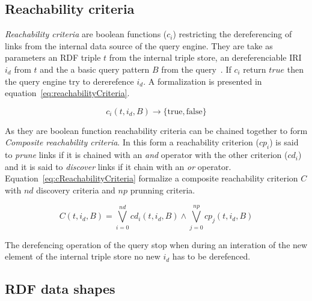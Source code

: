 \subsection{Reachability criteria}

\emph{Reachability criteria} are boolean functions ($c_i$) restricting the dereferencing of links from the internal data source of the query engine.
They are take as parameters an RDF triple $t$ from the internal triple store, an dereferenciable IRI $i_d$ from $t$ and the a basic query pattern $B$ from the query~\cite{Hartig2012}.
If $c_i$ return $true$ then the query engine try to dererefence $i_d$.
A formalization is presented in equation~\ref{eq:reachabilityCriteria}.


\begin{equation}\label{eq:reachabilityCriteria}
c_i(t, i_d, B) \rightarrow \{\mathrm{true}, \mathrm{false}\}
\end{equation}

As they are boolean function reachability criteria can be chained together to form \emph{Composite reachability criteria}.
In this form a reachability criterion ($cp_i$) is said to \emph{prune} links if it is chained with an \emph{and} operator with the other criterion ($cd_i$) and it is said to \emph{discover} links if it chain with an \emph{or} operator.
Equation~\ref{eq:cReachabilityCriteria} formalize a composite reachability criterion $C$ with $nd$ discovery criteria and $np$ prunning criteria.

\begin{equation}\label{eq:cReachabilityCriteria}
    C(t, i_d, B)  = \bigvee_{i=0}^{nd}cd_i(t, i_d, B) \land \bigvee_{j=0}^{np}cp_j(t, i_d, B)
\end{equation}

The derefencing operation of the query stop when during an interation of the new element of the internal triple store no new $i_d$ has to be derefenced.

\subsection{RDF data shapes}
